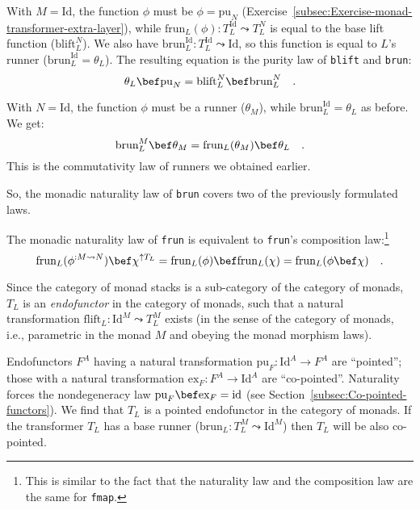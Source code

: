 With $M=\text{Id}$, the function $\phi$ must be $\phi=\text{pu}_{N}$
(Exercise~\ref{subsec:Exercise-monad-transformer-extra-layer}),
while $\text{frun}_{L}(\phi):T_{L}^{\text{Id}}\leadsto T_{L}^{N}$
is equal to the base lift function ($\text{blift}_{L}^{N}$). We also
have $\text{brun}_{L}^{\text{Id}}:T_{L}^{\text{Id}}\leadsto\text{Id}$,
so this function is equal to $L$\textsf{'}s runner ($\text{brun}_{L}^{\text{Id}}=\theta_{L}$).
The resulting equation is the purity law of \lstinline!blift! and
\lstinline!brun!:
\[
\theta_{L}\bef\text{pu}_{N}=\text{blift}_{L}^{N}\bef\text{brun}_{L}^{N}\quad.
\]

With $N=\text{Id}$, the function $\phi$ must be a runner ($\theta_{M}$),
while $\text{brun}_{L}^{\text{Id}}=\theta_{L}$ as before. We get:
\[
\text{brun}_{L}^{M}\bef\theta_{M}=\text{frun}_{L}(\theta_{M})\bef\theta_{L}\quad.
\]
This is the commutativity law of runners we obtained earlier.

So, the monadic naturality law of \lstinline!brun! covers two of
the previously formulated laws.

The monadic naturality law of \lstinline!frun! is equivalent to \lstinline!frun!\textsf{'}s
composition law:\footnote{This is similar to the fact that the naturality law and the composition
law are the same for \lstinline!fmap!.}
\[
\text{frun}_{L}(\phi^{:M\leadsto N})\bef\chi^{\uparrow T_{L}}=\text{frun}_{L}(\phi)\bef\text{frun}_{L}(\chi)=\text{frun}_{L}(\phi\bef\chi)\quad.
\]

Since the category of monad stacks is a sub-category of the category
of monads, $T_{L}$ is an \emph{endofunctor}
in the category of monads, such that a natural transformation $\text{flift}_{L}:\text{Id}^{M}\leadsto T_{L}^{M}$
exists (in the sense of the category of monads, i.e., parametric in
the monad $M$ and obeying the monad morphism laws). 

Endofunctors $F^{A}$ having a natural transformation $\text{pu}_{F}:\text{Id}^{A}\rightarrow F^{A}$
are \textsf{``}pointed\textsf{''};
those with a natural transformation $\text{ex}_{F}:F^{A}\rightarrow\text{Id}^{A}$
are \textsf{``}co-pointed\textsf{''}.
Naturality forces the nondegeneracy law $\text{pu}_{F}\bef\text{ex}_{F}=\text{id}$
(see Section~\ref{subsec:Co-pointed-functors}). We find that $T_{L}$
is a pointed endofunctor in the category of monads. If the transformer
$T_{L}$ has a base runner ($\text{brun}_{L}:T_{L}^{M}\leadsto\text{Id}^{M}$)
then $T_{L}$ will be also co-pointed.

